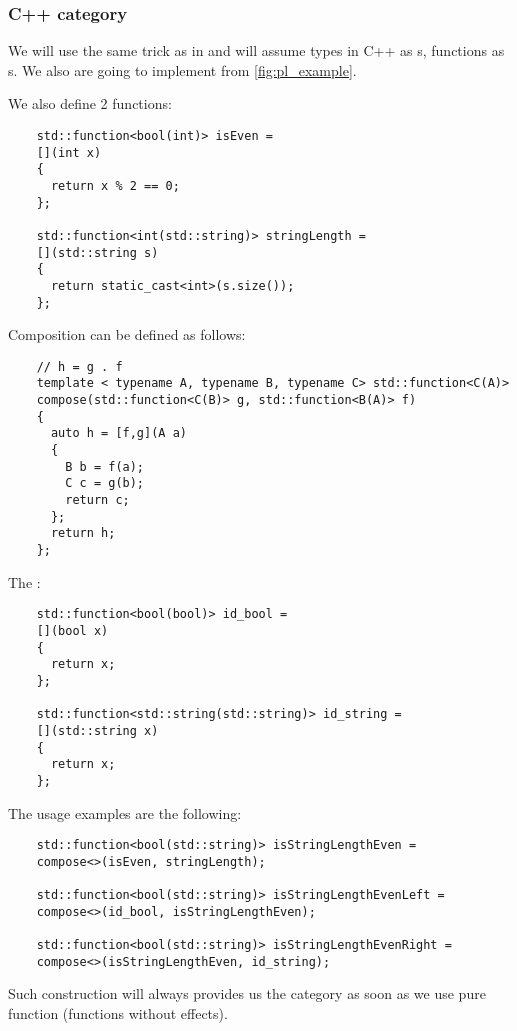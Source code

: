 \subsubsection{\textbf{C++} category}
\begin{example}
  \label{ex:cppcategory}
  We will use the same trick as in  and
  will assume 
  types in C++ as s, 
  functions as s.
  We also are going to implement
   from \cref{fig:pl_example}.


  We  also define 2 functions:
  \begin{verbatim}
    std::function<bool(int)> isEven =
    [](int x)
    {
      return x % 2 == 0;                
    };

    std::function<int(std::string)> stringLength =
    [](std::string s)
    {
      return static_cast<int>(s.size());
    };
  \end{verbatim}

  Composition can be defined as follows:
  \begin{verbatim}
    // h = g . f
    template < typename A, typename B, typename C> std::function<C(A)>
    compose(std::function<C(B)> g, std::function<B(A)> f) 
    {
      auto h = [f,g](A a)
      {
        B b = f(a);
        C c = g(b);
        return c;           
      };  
      return h;  
    };
  \end{verbatim}

  The :
  \begin{verbatim}
    std::function<bool(bool)> id_bool =
    [](bool x)
    {
      return x;    
    };
    
    std::function<std::string(std::string)> id_string =
    [](std::string x)
    {
      return x;    
    };    
  \end{verbatim}

  The usage examples are the following:
  \begin{verbatim}
    std::function<bool(std::string)> isStringLengthEven =
    compose<>(isEven, stringLength);

    std::function<bool(std::string)> isStringLengthEvenLeft =
    compose<>(id_bool, isStringLengthEven);

    std::function<bool(std::string)> isStringLengthEvenRight =
    compose<>(isStringLengthEven, id_string);
  \end{verbatim}

  Such construction will always provides us the category as soon as we
  use pure function (functions without effects).
\end{example}

